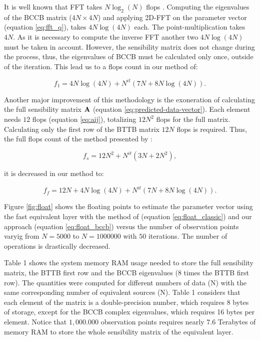 \documentclass[manuscript,revised]{geophysics}
\begin{document}
It is well known that FFT takes $N \log_2(N)$ flops \cite[]{brigham1988fast}. Computing the eigenvalues of the BCCB matrix ($4N \times 4N$) and applying 2D-FFT on the parameter vector (equation \ref{eq:fft_q}), takes $4N \log(4N)$ each. The point-multiplication takes $4N$. As it is necessary to compute the inverse FFT another two $4N \log(4N)$ must be taken in account. However, the sensibility matrix does not change during the process, thus, the eigenvalues of BCCB must be calculated only once, outside of the iteration. This lead us to a flops count in our method of:

\begin{equation}
f_1 = 4N\log(4N) + N^{it} (7N + 8N\log(4N)).
\label{eq:float_bccb}
\end{equation}

Another major improvement of this methodology is the exoneration of calculating the full sensibility matrix $\tensor{A}$ (equation \ref{eq:predicted-data-vector}). Each element needs $12$ flops (equation \ref{eq:aij}), totalizing $12N^2$ flops for the full matrix. Calculating only the first row of the BTTB matrix $12N$ flops is required.
Thus, the full flops count of the method presented by \citet{siqueira-etal2017}:

\begin{equation}
f_s = 12N^2 + N^{it} (3N + 2N^2),
\label{eq:float_siqueira}
\end{equation}

it is decreased in our method to:

\begin{equation}
f_f = 12N + 4N \log(4N) + N^{it} (7N + 8N\log(4N)).
\label{eq:float_new}
\end{equation}

Figure \ref{fig:float} shows the floating points to estimate the parameter vector using the fast equivalent layer with the method of \citet{siqueira-etal2017} (equation \ref{eq:float_classic}) and our approach (equation \ref{eq:float_bccb}) versus the number of observation points varyig from $N = 5000$ to $N = 1000000$ with $50$ iterations. The number of operations is drastically decreased.

Table 1 shows the system memory RAM usage needed to store the full sensibility matrix, the BTTB first row and the BCCB eigenvalues ($8$ times the BTTB first row). The quantities were computed for different numbers of data (N) with the same corresponding number of equivalent sources (N). Table 1 considers that each element of the matrix is a double-precision number, which requires 8 bytes of storage, except for the BCCB complex eigenvalues, which requires 16 bytes per element. Notice that $1,000.000$ observation points requires nearly $7.6$ Terabytes of memory RAM to store the whole sensibility matrix of the equivalent layer.
\end{document}
